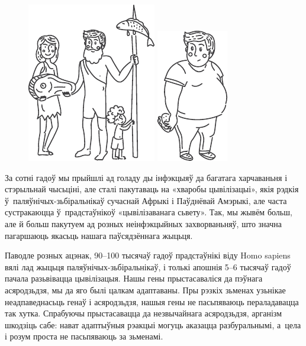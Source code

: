 \begin{figure}[htb!]
  \centering
  \includegraphics[scale=1.3]{willpower/ch2/1.pdf}
  \includegraphics[scale=1.3]{willpower/ch2/2.pdf}    
\end{figure}

За сотні гадоў мы прыйшлі ад голаду ды інфэкцыяў да багатага харчаваньня і стэрыльнай чысьціні, але сталі пакутаваць на «хваробы цывілізацыі», якія рэдкія ў~паляўнічых-зьбіральнікаў сучаснай Афрыкі і Паўднёвай Амэрыкі, але часта сустракаюцца ў~прадстаўнікоў «цывілізаванага сьвету». Так, мы жывём больш, але й больш пакутуем ад розных неінфэкцыйных захворваньняў, што значна пагаршаюць якасьць нашага паўсядзённага жыцьця.

Паводле розных ацэнак, 90--100 тысячаў гадоў прадстаўнікі віду Homo sapiens вялі лад жыцьця паляўнічых-зьбіральнікаў, і толькі апошнія 5--6 тысячаў гадоў пачала разьвівацца цывілізацыя. Нашы гены прыстасаваліся да пэўнага асяродзьдзя, мы да яго былі цалкам адаптаваны. Пры рэзкіх зьменах узьнікае неадпаведнасьць генаў і асяродзьдзя, нашыя гены не пасьпяваюць пераладавацца так хутка. Спрабуючы прыстасавацца да незвычайнага асяродзьдзя, арганізм шкодзіць сабе: нават адаптыўныя рэакцыі могуць аказацца разбуральнымі, а~цела і розум проста не пасьпяваюць за зьменамі.

